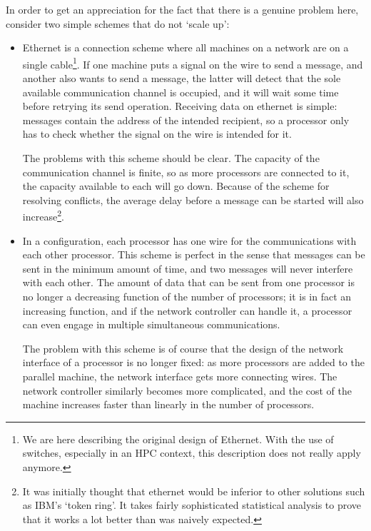 In order to get an appreciation for the fact that there is a genuine
problem here, consider two
simple schemes that do not `scale up':
\begin{itemize}
\item Ethernet is a connection scheme where all machines on a network
  are on a single cable\footnote{We are here describing the original
    design of Ethernet. With the use of switches, especially in an HPC
    context, this description does not really apply anymore.}. If one
  machine puts a signal on the wire to send a message, and another
  also wants to send a message, the latter will detect that the sole
  available communication channel is occupied, and it will wait some
  time before retrying its send operation. Receiving data on ethernet
  is simple: messages contain the address of the intended recipient,
  so a processor only has to check whether the signal on the wire is
  intended for it.

  The problems with this scheme should be clear. The capacity of the
  communication channel is finite, so as more processors are connected
  to it, the capacity available to each will go down. Because of the
  scheme for resolving conflicts, the average delay before a message
  can be started will also increase\footnote{It was initially
  thought that ethernet would be inferior to other solutions such as
  IBM's `token ring'. It takes fairly sophisticated statistical
  analysis to prove that it works a lot better than was
  naively expected.}.
\item In a  configuration,
  each processor has one wire for
  the communications with each other processor. This scheme is perfect
  in the sense that messages can be sent in the minimum amount of time,
  and two messages will never interfere with each other.
  The amount of data that can be sent from one
  processor is no longer a decreasing function of the number of
  processors; it is in fact an increasing function, and if the
  network controller can handle it, a processor can even engage in
  multiple simultaneous communications.

  The problem with this scheme is of course that the design of the
  network interface of a processor 
  is no longer fixed: as more processors are added
  to the parallel machine, the network interface gets more
  connecting wires. The network controller similarly becomes 
  more complicated, and the cost of the machine increases faster than
  linearly in the number of processors.
\end{itemize}

